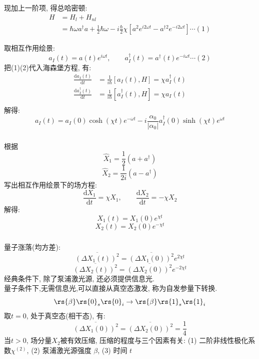 \begin{frame}
      \frametitle{}
      
现加上一阶项, 得总哈密顿: 
     \[ 
       \begin{aligned}
           H & = H_l + H_{nl} \\ 
           &= \hbar \omega a ^{\dagger } a  + \frac{1}{2}\hbar \omega  - i \frac{\hbar}{2} \chi [ a^2 e ^{i 2 \omega t} -  a ^{\dagger 2} e ^{-i 2 \omega t}]  \cdots  (1) 
           \end{aligned} \]

 取相互作用绘景: 
 \[ a_I(t) = a(t) e ^{i \omega t},  \qquad a^\dagger _I(t) = a^\dagger (t) e ^{-i \omega t} \cdots  (2)\] 
 把(1)(2)代入海森堡方程, 有: 
 \[ 
    \begin{aligned}
        \frac{\mathrm{d}a_I(t)}{\mathrm{d}t} & = \frac{1}{i \hbar} [a_I(t), H ] = \chi a^\dagger _I(t)  \\ 
        \frac{\mathrm{d}a^\dagger _I(t)}{\mathrm{d}t} & = \frac{1}{i \hbar} [a^\dagger _I(t), H ] = \chi a_I(t)  \\
    \end{aligned} \]
    解得: 
    \[ a_I(t) = a_I(0) \cosh(\chi t )e^{-\omega t} - i \frac{\alpha_0}{\left|\alpha_0\right|} a^\dagger_I(0) \sinh(\chi t ) e^{\omega t}\]
\end{frame}   

\begin{frame}
 \frametitle{}
 根据  \[ \hat{X}_{1} =\frac{1}{2}\left(a + a^{\dagger}\right)\]
 \[ \hat{X}_{2} = \frac{1}{2 i}\left(a - a^{\dagger}\right)\]
写出相互作用绘景下的场方程: 
\[ \frac{\mathrm{d}X_1}{\mathrm{d}t} =  \chi X_1 , \qquad  \frac{\mathrm{d}X_2}{\mathrm{d}t} = - \chi X_2  \]
解得: 
\[ X_1(t) = X_1 (0) e ^{\chi t}\]
\[ X_2(t) = X_2 (0) e ^{-\chi t}\]
\end{frame}

\begin{frame}
 \frametitle{}
    量子涨落(均方差): 
    \[\overline{(\Delta X_1(t))^2} = \overline{(\Delta X_1(0))^2}  e^{2\chi t}  \]
    \[\overline{(\Delta X_2(t))^2} = \overline{(\Delta X_2(0))^2}  e^{-2\chi t}  \]
    经典条件下, 除了泵浦激光源, 还必须提供信息光. \\ 
    量子条件下,无需信息光,可以直接从真空态激发, 称为自发参量下转换. 
    \[ \rs{\beta} \rs{0}_s  \rs{0}_i \to \rs{\beta} \rs{1}_s  \rs{1}_i \]
    取$t=0$, 处于真空态(相干态), 有:
    \[\overline{(\Delta X_1(0))^2} = \overline{(\Delta X_2(0))^2} =\frac{1}{4}\]
    当$t>0$, 场分量$X_2$被有效压缩, 压缩的程度与三个因素有关: (1) 二阶非线性极化系数$\chi^{(2)}$, (2) 泵浦激光源强度 $\beta$,  (3) 时间 $t$ 
\end{frame}


